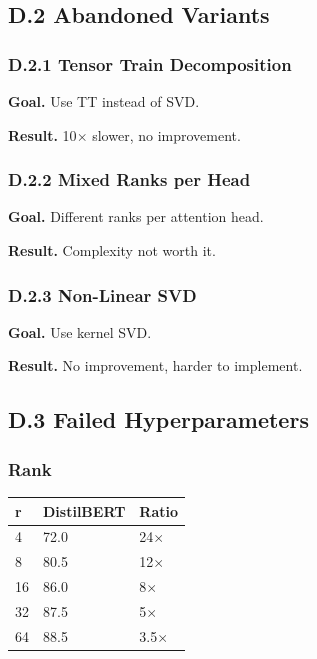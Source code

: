 \subsection{D.2 Abandoned Variants}

\subsubsection{D.2.1 Tensor Train Decomposition}

\textbf{Goal.} Use TT instead of SVD.

\textbf{Result.} 10$\times$ slower, no improvement.

\subsubsection{D.2.2 Mixed Ranks per Head}

\textbf{Goal.} Different ranks per attention head.

\textbf{Result.} Complexity not worth it.

\subsubsection{D.2.3 Non-Linear SVD}

\textbf{Goal.} Use kernel SVD.

\textbf{Result.} No improvement, harder to implement.

\subsection{D.3 Failed Hyperparameters}

\subsubsection{Rank}

\begin{table}[H]
\centering
\small
\begin{tabular}{lll}
\toprule
\textbf{r} & \textbf{DistilBERT} & \textbf{Ratio} \\
\midrule
4 & 72.0 & 24$\times$ \\
8 & 80.5 & 12$\times$ \\
16 & 86.0 & 8$\times$ \\
32 & 87.5 & 5$\times$ \\
64 & 88.5 & 3.5$\times$ \\
\bottomrule
\end{tabular}
\end{table}

